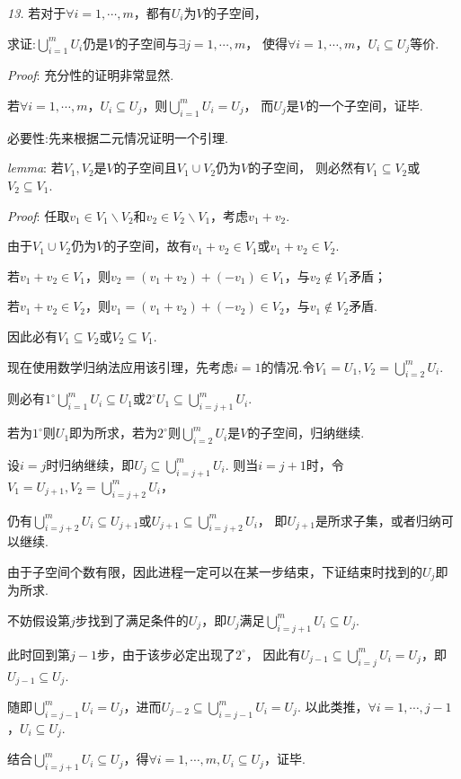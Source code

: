 \textit{13.}
若对于\(\forall i=1,\cdots,m\)，都有\(U_i\)为\(V\)的子空间，

求证:\(\bigcup_{i=1}^m U_i\)仍是\(V\)的子空间与\(\exists j=1,\cdots,m\)，
使得\(\forall i=1,\cdots,m\)，\(U_i \subseteq U_j\)等价.

\textit{Proof}:
充分性的证明非常显然.

若\(\forall i=1,\cdots,m\)，\(U_i \subseteq U_j\)，则\(\bigcup_{i=1}^m U_i=U_j\)，
而\(U_j\)是\(V\)的一个子空间，证毕.

必要性:先来根据二元情况证明一个引理.

\textit{lemma}:
若\(V_1,V_2\)是\(V\)的子空间且\(V_1 \cup V_2\)仍为\(V\)的子空间，
则必然有\(V_1 \subseteq V_2\)或\(V_2 \subseteq V_1\).

\textit{Proof}:
任取\(v_1 \in V_1 \backslash V_2\)和\(v_2 \in V_2 \backslash V_1\)，考虑\(v_1+v_2\).

由于\(V_1 \cup V_2\)仍为\(V\)的子空间，故有\(v_1+v_2 \in V_1\)或\(v_1+v_2 \in V_2\).

若\(v_1+v_2 \in V_1\)，则\(v_2=(v_1+v_2)+(-v_1) \in V_1\)，与\(v_2 \notin V_1\)矛盾；

若\(v_1+v_2 \in V_2\)，则\(v_1=(v_1+v_2)+(-v_2) \in V_2\)，与\(v_1 \notin V_2\)矛盾.

因此必有\(V_1 \subseteq V_2\)或\(V_2 \subseteq V_1\).

现在使用数学归纳法应用该引理，先考虑\(i=1\)的情况.令\(V_1=U_1,V_2=\bigcup_{i=2}^m U_i\).

则必有\(1^{\circ}\bigcup_{i=1}^m U_i \subseteq U_1\)或\(2^{\circ}U_1 \subseteq \bigcup_{i=j+1}^m U_i\).

若为\(1^{\circ}\)则\(U_1\)即为所求，若为\(2^{\circ}\)则\(\bigcup_{i=2}^m U_i\)是\(V\)的子空间，归纳继续.

设\(i=j\)时归纳继续，即\(U_j \subseteq \bigcup_{i=j+1}^m U_i\).
则当\(i=j+1\)时，令\(V_1=U_{j+1},V_2=\bigcup_{i=j+2}^m U_i\)，

仍有\(\bigcup_{i=j+2}^m U_i \subseteq U_{j+1}\)或\(U_{j+1} \subseteq \bigcup_{i=j+2}^m U_i\)，
即\(U_{j+1}\)是所求子集，或者归纳可以继续.

由于子空间个数有限，因此进程一定可以在某一步结束，下证结束时找到的\(U_j\)即为所求.

不妨假设第\(j\)步找到了满足条件的\(U_j\)，即\(U_j\)满足\(\bigcup_{i=j+1}^m U_i\subseteq U_j\).

此时回到第\(j-1\)步，由于该步必定出现了\(2^{\circ}\)，
因此有\(U_{j-1} \subseteq \bigcup_{i=j}^m U_i=U_j\)，即\(U_{j-1} \subseteq U_j\).

随即\(\bigcup_{i=j-1}^m U_i=U_j\)，进而\(U_{j-2} \subseteq \bigcup_{i=j-1}^m U_i=U_j\).
以此类推，\(\forall i=1,\cdots,j-1\)，\(U_i\subseteq U_j\).

结合\(\bigcup_{i=j+1}^m U_i \subseteq U_j\)，得\(\forall i=1,\cdots,m,U_i \subseteq U_j\)，证毕.

